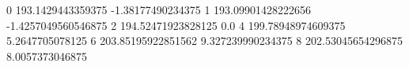 0 193.1429443359375 -1.38177490234375
1 193.09901428222656 -1.4257049560546875
2 194.52471923828125 0.0
4 199.78948974609375 5.2647705078125
6 203.85195922851562 9.327239990234375
8 202.53045654296875 8.0057373046875
